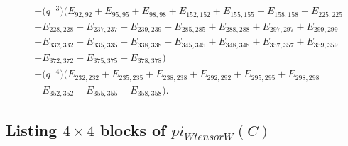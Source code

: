 \documentclass[10pt,a4paper]{amsart}
\numberwithin{equation}{section}
\theoremstyle{definition}
\def\boldsymbol#1{#1}
\def\pi{pi}
\def\otimes{ tensor }
\begin{document}
\begin{align*}
&+\bigl(q^{-3}\bigr)(E_{92,92}+E_{95,95}+E_{98,98}+E_{152,152}+E_{155,155}+E_{158,158}+E_{225,225}\\
&+E_{228,228}+E_{237,237}+E_{239,239}+E_{285,285}+E_{288,288}+E_{297,297}+E_{299,299}\\
&+E_{332,332}+E_{335,335}+E_{338,338}+E_{345,345}+E_{348,348}+E_{357,357}+E_{359,359}\\
&+E_{372,372}+E_{375,375}+E_{378,378})\\
&+\bigl(q^{-4}\bigr)(E_{232,232}+E_{235,235}+E_{238,238}+E_{292,292}+E_{295,295}+E_{298,298}\\
&+E_{352,352}+E_{355,355}+E_{358,358}).
\end{align*}

\subsection[Listing 4 times 4 blocks of pi\_\{W otimes W\}(C)]{Listing $\boldsymbol{4 \times 4}$ blocks of $\boldsymbol{\pi_{W \otimes W}(C)}$}
\label{4x4blocks}
\end{document}
